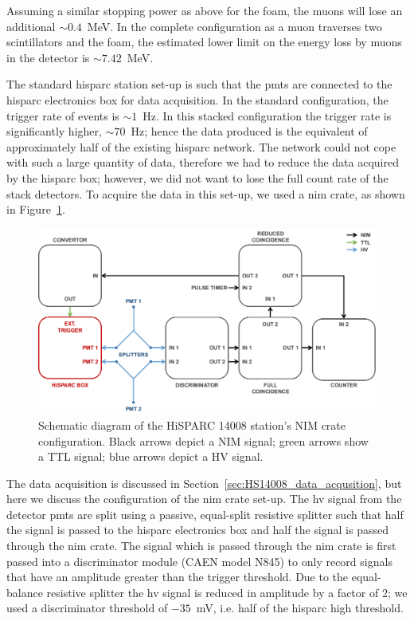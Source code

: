  Assuming a similar stopping power as above for the foam, the muons will lose an additional $\sim 0.4$~MeV. In the complete configuration as a muon traverses two scintillators and the foam, the estimated lower limit on the energy loss by muons in the detector is $\sim 7.42$~MeV.


The standard \gls{hisparc} station set-up is such that the \glspl{pmt} are connected to the \gls{hisparc} electronics box for data acquisition. In the standard configuration, the trigger rate of events is $\sim 1$~Hz. In this stacked configuration the trigger rate is significantly higher, $\sim 70$~Hz; hence the data produced is the equivalent of approximately half of the existing \gls{hisparc} network. The network could not cope with such a large quantity of data, therefore we had to reduce the data acquired by the \gls{hisparc} box; however, we did not want to lose the full count rate of the stack detectors. To acquire the data in this set-up, we used a \gls{nim} crate, as shown in Figure~\ref{fig:14008_NIM}.

\begin{figure}[ht!]
	\centering
	\includegraphics[width=\columnwidth]{14008_nim_config.png}
	\caption{Schematic diagram of the HiSPARC 14008 station's NIM crate configuration. Black arrows depict a NIM signal; green arrows show a TTL signal; blue arrows depict a HV signal.}
	\label{fig:14008_NIM}
\end{figure}

The data acquisition is discussed in Section~\ref{sec:HS14008_data_acqusition}, but here we discuss the configuration of the \gls{nim} crate set-up. The \gls{hv} signal from the detector \glspl{pmt} are split using a passive, equal-split resistive splitter such that half the signal is passed to the \gls{hisparc} electronics box and half the signal is passed through the \gls{nim} crate. The signal which is passed through the \gls{nim} crate is first passed into a discriminator module (CAEN model N845) to only record signals that have an amplitude greater than the trigger threshold. Due to the equal-balance resistive splitter the \gls{hv} signal is reduced in amplitude by a factor of 2; we used a discriminator threshold of $-35$~mV, i.e. half of the \gls{hisparc} high threshold.

